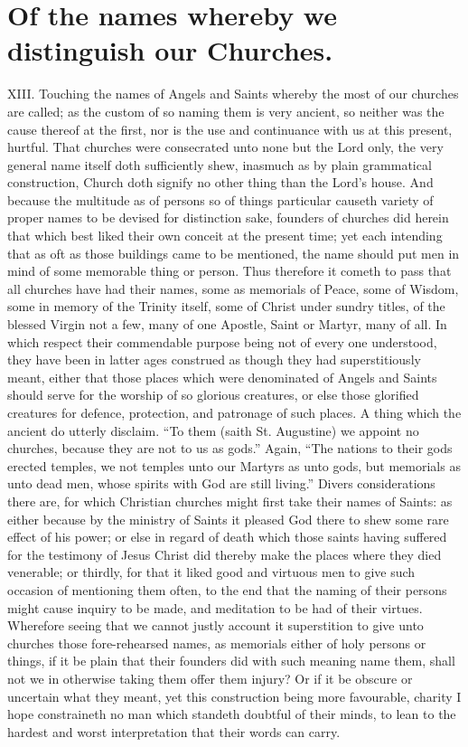 \section*{Of the names whereby we distinguish our Churches.}
XIII. Touching the names of Angels and Saints whereby the most of our churches are called; as the custom of so naming them is very ancient, so neither was the cause thereof at the first, nor is the use and continuance with us at this present, hurtful. That churches were consecrated unto none but the Lord only, the very general name itself doth sufficiently shew, inasmuch as by plain grammatical construction, Church doth signify no other thing than the Lord’s house. And because the multitude as of persons so of things particular causeth variety of proper names to be devised for distinction sake, founders of churches did herein that which best liked their own conceit at the present time; yet each intending that as oft as those buildings came to be mentioned, the name should put men in mind of some memorable thing or person. Thus therefore it cometh to pass that all churches have had their names, some as memorials of Peace, some of Wisdom, some in memory of the Trinity itself, some of Christ under sundry titles, of the blessed Virgin not a few, many of one Apostle, Saint or Martyr, many of all.
In which respect their commendable purpose being not of every one understood, they have been in latter ages construed as though they had superstitiously meant, either that those places which were denominated of Angels and Saints should serve for the worship of so glorious creatures, or else those glorified creatures for defence, protection, and  patronage of such places. A thing which the ancient do utterly disclaim. “To them (saith St. Augustine) we appoint no churches, because they are not to us as gods.” Again, “The nations to their gods erected temples, we not temples unto our Martyrs as unto gods, but memorials as unto dead men, whose spirits with God are still living.”
Divers considerations there are, for which Christian churches might first take their names of Saints: as either because by the ministry of Saints it pleased God there to shew some rare effect of his power; or else in regard of death which those saints having suffered for the testimony of Jesus Christ did thereby make the places where they died venerable; or thirdly, for that it liked good and virtuous men to give such occasion of mentioning them often, to the end that the naming of their persons might cause inquiry to be made, and meditation to be had of their virtues. Wherefore seeing that we cannot justly account it superstition to give unto churches those fore-rehearsed names, as memorials either of holy persons or things, if it be plain that their founders did with such meaning name them, shall not we in otherwise taking them offer them injury? Or if it be obscure or uncertain what they meant, yet this construction being more  favourable, charity I hope constraineth no man which standeth doubtful of their minds, to lean to the hardest and worst interpretation that their words can carry.
